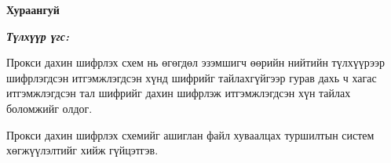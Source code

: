 

\begin{center}
    {\scshape\Large \univname\par} %
    {\scshape\large \facname\par}\vspace{0.5cm} %
    {\huge\textbf{{Хураангуй}} \par}
    \bigskip
    {\Large{\ttitle} \par} %
    \bigskip

    {\normalsize \shortname \par} %
    \addressname
\end{center}

\textit{\textbf{Түлхүүр үгс: \keywordnames}}
\bigskip

Прокси дахин шифрлэх схем нь өгөгдөл эзэмшигч өөрийн нийтийн түлхүүрээр шифрлэгдсэн итгэмжлэгдсэн хүнд шифрийг тайлахгүйгээр гурав дахь ч хагас итгэмжлэгдсэн тал шифрийг дахин шифрлэж итгэмжлэгдсэн хүн тайлах боломжийг олдог.

Прокси дахин шифрлэх схемийг ашиглан файл хуваалцах туршилтын систем хөгжүүлэлтийг хийж гүйцэтгэв.